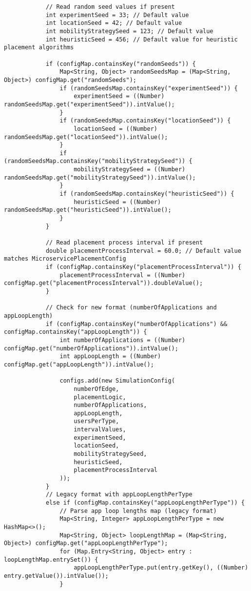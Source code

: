 \begin{verbatim}
            // Read random seed values if present
            int experimentSeed = 33; // Default value
            int locationSeed = 42; // Default value
            int mobilityStrategySeed = 123; // Default value
            int heuristicSeed = 456; // Default value for heuristic placement algorithms
            
            if (configMap.containsKey("randomSeeds")) {
                Map<String, Object> randomSeedsMap = (Map<String, Object>) configMap.get("randomSeeds");
                if (randomSeedsMap.containsKey("experimentSeed")) {
                    experimentSeed = ((Number) randomSeedsMap.get("experimentSeed")).intValue();
                }
                if (randomSeedsMap.containsKey("locationSeed")) {
                    locationSeed = ((Number) randomSeedsMap.get("locationSeed")).intValue();
                }
                if (randomSeedsMap.containsKey("mobilityStrategySeed")) {
                    mobilityStrategySeed = ((Number) randomSeedsMap.get("mobilityStrategySeed")).intValue();
                }
                if (randomSeedsMap.containsKey("heuristicSeed")) {
                    heuristicSeed = ((Number) randomSeedsMap.get("heuristicSeed")).intValue();
                }
            }
            
            // Read placement process interval if present
            double placementProcessInterval = 60.0; // Default value matches MicroservicePlacementConfig
            if (configMap.containsKey("placementProcessInterval")) {
                placementProcessInterval = ((Number) configMap.get("placementProcessInterval")).doubleValue();
            }

            // Check for new format (numberOfApplications and appLoopLength)
            if (configMap.containsKey("numberOfApplications") && configMap.containsKey("appLoopLength")) {
                int numberOfApplications = ((Number) configMap.get("numberOfApplications")).intValue();
                int appLoopLength = ((Number) configMap.get("appLoopLength")).intValue();
                
                configs.add(new SimulationConfig(
                    numberOfEdge, 
                    placementLogic, 
                    numberOfApplications,
                    appLoopLength,
                    usersPerType,
                    intervalValues,
                    experimentSeed,
                    locationSeed,
                    mobilityStrategySeed,
                    heuristicSeed,
                    placementProcessInterval
                ));
            } 
            // Legacy format with appLoopLengthPerType
            else if (configMap.containsKey("appLoopLengthPerType")) {
                // Parse app loop lengths map (legacy format)
                Map<String, Integer> appLoopLengthPerType = new HashMap<>();
                Map<String, Object> loopLengthMap = (Map<String, Object>) configMap.get("appLoopLengthPerType");
                for (Map.Entry<String, Object> entry : loopLengthMap.entrySet()) {
                    appLoopLengthPerType.put(entry.getKey(), ((Number) entry.getValue()).intValue());
                }
                

\end{verbatim}
